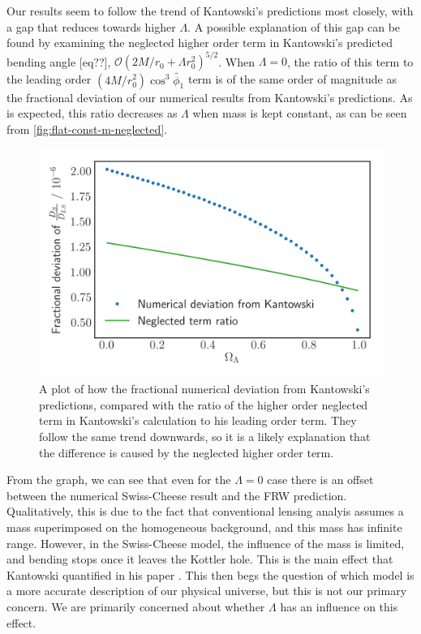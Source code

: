 
Our results seem to follow the trend of Kantowski's predictions most closely, with a gap that reduces towards higher $\Lambda$. A possible explanation of this gap can be found by examining the neglected higher order term in Kantowski's predicted bending angle [eq??], $\mathcal{O}\left ( 2M/r_0 + \Lambda r_0^2 \right )^{5/2}$. When $\Lambda = 0$, the ratio of this term to the leading order $(4M/r_0^2) \cos^3 \tilde{\phi_1}$ term is of the same order of magnitude as the fractional deviation of our numerical results from Kantowski's predictions. As is expected, this ratio decreases as $\Lambda$ when mass is kept constant, as can be seen from \autoref{fig:flat-const-m-neglected}. 

\begin{figure}
  \centering
  \includegraphics[height=0.5\linewidth]{images/flat-neglected.png}
  \caption{A plot of how the fractional numerical deviation from Kantowski's predictions, compared with the ratio of the higher order neglected term in Kantowski's calculation to his leading order term. They follow the same trend downwards, so it is a likely explanation that the difference is caused by the neglected higher order term.}
  \label{fig:flat-const-m-neglected}
\end{figure}

From the graph, we can see that even for the $\Lambda = 0$ case there is an offset between the numerical Swiss-Cheese result and the FRW prediction. Qualitatively, this is due to the fact that conventional lensing analyis assumes a mass superimposed on the homogeneous background, and this mass has infinite range. However, in the Swiss-Cheese model, the influence of the mass is limited, and bending stops once it leaves the Kottler hole. This is the main effect that Kantowski quantified in his paper \citet{kantowski2010gravitational}. This then begs the question of which model is a more accurate description of our physical universe, but this is not our primary concern. We are primarily concerned about whether $\Lambda$ has an influence on this effect. 


